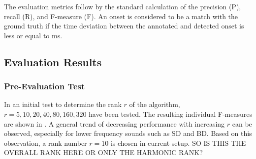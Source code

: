 \documentclass{article}
\begin{document}
The evaluation metrics follow by the standard calculation of the precision (P), recall (R), and F-measure (F). %
An onset is considered to be a match with the ground truth if the time deviation between the annotated and detected onset is less or equal to \unit[50]{ms}.  
%
%
  



\subsection{Evaluation Results}\label{subsec:evaluation results}

\subsubsection{Pre-Evaluation Test}
In an initial test to determine the rank $r$ of the algorithm, $r = {5, 10, 20, 40, 80, 160, 320}$ have been tested. The resulting individual F-measures are shown in . A general trend of decreasing performance with increasing $r$ can be observed, especially for lower frequency sounds such as SD and BD. Based on this observation, a rank number $r = 10$ is chosen in current setup. SO IS THIS THE OVERALL RANK HERE OR ONLY THE HARMONIC RANK?
\end{document}
